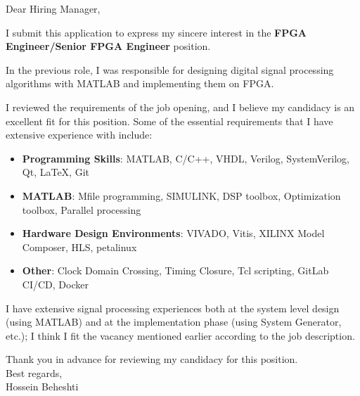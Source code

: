 \documentclass[localFont]{awesome-source-cv} %
\begin{document}
\makecvheader


\bigskip %
Dear Hiring Manager,

\bigskip 

I submit this application to express my sincere interest in the \textbf{FPGA Engineer/Senior FPGA Engineer} position.

In the previous role, I was responsible for designing digital signal processing algorithms with MATLAB and implementing them on FPGA.

I reviewed the requirements of the job opening, and I believe my candidacy is an excellent fit for this position. Some of the essential requirements that I have extensive experience with include:

\begin{itemize}
	\item \textbf{Programming Skills}:
	      MATLAB, C/C++, VHDL, Verilog, SystemVerilog, Qt, \LaTeX, Git
	\item \textbf{MATLAB}:
	      Mfile programming, SIMULINK, DSP toolbox, Optimization toolbox, Parallel processing
	\item \textbf{Hardware Design Environments}:
	      VIVADO, Vitis, XILINX Model Composer, HLS, petalinux
	\item \textbf{Other}:
	      Clock Domain Crossing, Timing Closure, Tcl scripting, GitLab CI/CD, Docker
\end{itemize}

I have extensive signal processing experiences both at the system level design (using MATLAB) and at the implementation phase (using System Generator, etc.); I think I fit the vacancy mentioned earlier according to the job description.

Thank you in advance for reviewing my candidacy for this position.\\

\bigskip 
Best regards,\\
\bigskip 
Hossein Beheshti \\
\end{document}
